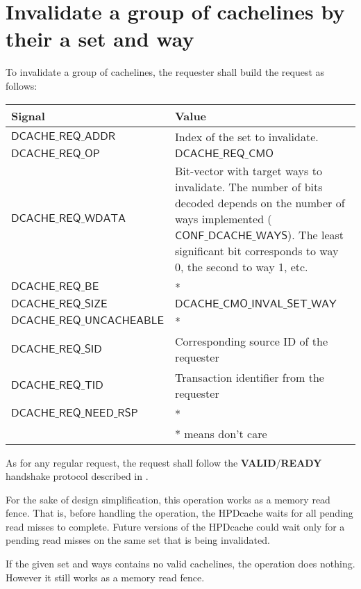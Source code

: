 \documentclass[10pt,titlepage,twoside]{book}
\begin{document}
\newpage
\section{Invalidate a group of cachelines by their a set and way}

To invalidate a group of cachelines, the requester shall build the request as follows:

{\centering\footnotesize\begin{tabular}{p{.38\linewidth}p{.55\linewidth}}
  \toprule
  \textbf{Signal}
  & \textbf{Value} \\
  \midrule
  $\mathsf{DCACHE\_REQ\_ADDR}$
  & Index of the set to invalidate.\\
  \midrule
  $\mathsf{DCACHE\_REQ\_OP}$
  & $\mathsf{DCACHE\_REQ\_CMO}$ \\
  \midrule
  $\mathsf{DCACHE\_REQ\_WDATA}$
  & Bit-vector with target ways to invalidate.
  The number of bits decoded depends on the number of ways implemented ($\mathsf{CONF\_DCACHE\_WAYS}$).
  The least significant bit corresponds to way 0, the second to way 1, etc.\\
  \midrule
  $\mathsf{DCACHE\_REQ\_BE}$
  & *\\
  \midrule
  $\mathsf{DCACHE\_REQ\_SIZE}$
  & $\mathsf{DCACHE\_CMO\_INVAL\_SET\_WAY}$\\
  \midrule
  $\mathsf{DCACHE\_REQ\_UNCACHEABLE}$
  & *\\
  \midrule
  $\mathsf{DCACHE\_REQ\_SID}$
  & Corresponding source ID of the requester\\
  \midrule
  $\mathsf{DCACHE\_REQ\_TID}$
  & Transaction identifier from the requester\\
  \midrule
  $\mathsf{DCACHE\_REQ\_NEED\_RSP}$
  & *\\
  \bottomrule
  & * means don't care \\
\end{tabular}}

As for any regular request, the request shall follow the \textbf{VALID}/\textbf{READY} handshake protocol described in .

For the sake of design simplification, this operation works as a memory read fence.
That is, before handling the operation, the \ac{HPDcache} waits for all pending read misses to complete.
Future versions of the HPDcache could wait only for a pending read misses on the same set that is being invalidated.

If the given set and ways contains no valid cachelines, the operation does nothing.
However it still works as a memory read fence.
\end{document}
